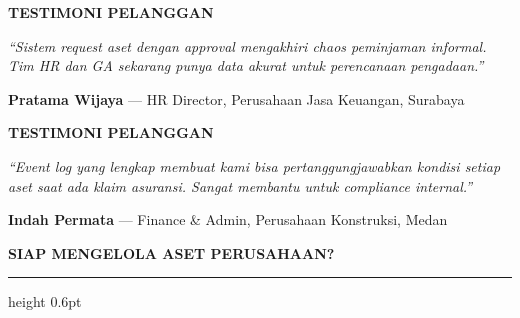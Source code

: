 \documentclass[a4paper]{article}
\newcommand{\sectiontitle}[1]{%
    \vspace{10pt}%
    {\fontsize{13}{16}\selectfont\bfseries\color{BlueDark} #1}\par\vspace{3pt}%
    {\color{BluePrimary}\hrule height 0.6pt}\par\vspace{8pt}}
\begin{document}
\noindent
\begin{minipage}[t]{0.485\textwidth}
    \colorbox{TealBg}{%
        \begin{minipage}{\dimexpr\textwidth-14pt}
            \vspace{5pt}
            {\fontsize{10}{13}\selectfont\bfseries\color{TealDark} TESTIMONI PELANGGAN}
            \vspace{5pt}
        \end{minipage}}
    \vspace{6pt}

    {\fontsize{9}{13}\selectfont\color{TextDark}
    \textit{``Sistem request aset dengan approval mengakhiri chaos peminjaman informal. Tim HR dan GA sekarang punya data akurat untuk perencanaan pengadaan.''}

    \vspace{4pt}
    {\bfseries\color{TealDark} Pratama Wijaya} {\color{TextLight}--- HR Director, Perusahaan Jasa Keuangan, Surabaya}}
\end{minipage}%
\hfill%
\begin{minipage}[t]{0.485\textwidth}
    \colorbox{TealBg}{%
        \begin{minipage}{\dimexpr\textwidth-14pt}
            \vspace{5pt}
            {\fontsize{10}{13}\selectfont\bfseries\color{TealDark} TESTIMONI PELANGGAN}
            \vspace{5pt}
        \end{minipage}}
    \vspace{6pt}

    {\fontsize{9}{13}\selectfont\color{TextDark}
    \textit{``Event log yang lengkap membuat kami bisa pertanggungjawabkan kondisi setiap aset saat ada klaim asuransi. Sangat membantu untuk compliance internal.''}

    \vspace{4pt}
    {\bfseries\color{TealDark} Indah Permata} {\color{TextLight}--- Finance \& Admin, Perusahaan Konstruksi, Medan}}
\end{minipage}

\vspace{8pt}

\sectiontitle{SIAP MENGELOLA ASET PERUSAHAAN?}
\end{document}
